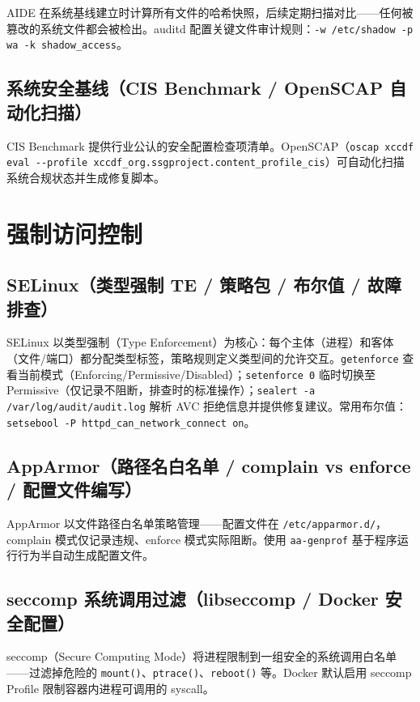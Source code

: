 \documentclass[12pt,UTF8]{ctexbook}
\begin{document}
AIDE 在系统基线建立时计算所有文件的哈希快照，后续定期扫描对比——任何被篡改的系统文件都会被检出。auditd 配置关键文件审计规则：\verb|-w /etc/shadow -p wa -k shadow_access|。

  \section{系统安全基线（CIS Benchmark / OpenSCAP 自动化扫描）}

CIS Benchmark 提供行业公认的安全配置检查项清单。OpenSCAP（\verb|oscap xccdf eval --profile xccdf_org.ssgproject.content_profile_cis|）可自动化扫描系统合规状态并生成修复脚本。


\chapter{强制访问控制}
\label{chap:mac}

  \section{SELinux（类型强制 TE / 策略包 / 布尔值 / 故障排查）}

SELinux 以类型强制（Type Enforcement）为核心：每个主体（进程）和客体（文件/端口）都分配类型标签，策略规则定义类型间的允许交互。\verb|getenforce| 查看当前模式（Enforcing/Permissive/Disabled）；\verb|setenforce 0| 临时切换至 Permissive（仅记录不阻断，排查时的标准操作）；\verb|sealert -a /var/log/audit/audit.log| 解析 AVC 拒绝信息并提供修复建议。常用布尔值：\verb|setsebool -P httpd_can_network_connect on|。

  \section{AppArmor（路径名白名单 / complain vs enforce / 配置文件编写）}

AppArmor 以文件路径白名单策略管理——配置文件在 \verb|/etc/apparmor.d/|，complain 模式仅记录违规、enforce 模式实际阻断。使用 \verb|aa-genprof| 基于程序运行行为半自动生成配置文件。

  \section{seccomp 系统调用过滤（libseccomp / Docker 安全配置）}

seccomp（Secure Computing Mode）将进程限制到一组安全的系统调用白名单——过滤掉危险的 \verb|mount()|、\verb|ptrace()|、\verb|reboot()| 等。Docker 默认启用 seccomp Profile 限制容器内进程可调用的 syscall。
\end{document}
